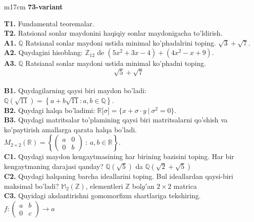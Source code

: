 \documentclass{article}
\begin{document}
\begin{tabular}{m{17cm}}
\textbf{73-variant}
\newline

\textbf{T1.} Fundamental teoremalar. \\
\textbf{T2.} Ratsional sonlar maydonini haqiqiy sonlar maydonigacha to'ldirish. \\
\textbf{A1.} \(\mathbb{Q}\) Ratsianal sonlar maydoni ustida minimal ko'phadalrini toping.
\(\sqrt{3} + \sqrt{7}\). \\
\textbf{A2.} Quydagini hisoblang:
\(\mathbb{Z}_{12}\) de \(\left( 5x^{2} + 3x - 4 \right) + \left( 4x^{2} - x + 9 \right)\). \\
\textbf{A3.} \(\mathbb{Q}\) Ratsianal sonlar maydoni ustida minimal ko'phadni toping.
\[\sqrt{5} + \sqrt{7}\] \\
\textbf{B1.} Quydagilarning qaysi biri maydon bo'ladi:
\(\mathbb{Q}\left( \sqrt{11} \right) = \left\{ a + b\sqrt{11}:a,b \in \mathbb{Q} \right\}\). \\
\textbf{B2.} Quydagi halqa bo'ladimi:
\(\mathbb{R\lbrack}\sigma\rbrack = \{ x + \sigma \cdot y\ |\ \sigma^{2} = 0\}\). \\
\textbf{B3.} Quydagi matritsalar to'plamining qaysi biri matritsalarni qo'shish va ko'paytirish amallarga qarata halqa bo'ladi.
\(M_{2 \times 2}\mathbb{(R) =}\left\{ \begin{pmatrix}
a & 0 \\
0 & b
\end{pmatrix}\ :\ a,b \in \mathbb{R} \right\}\). \\
\textbf{C1.} Quydagi maydon kengaytmasining har birining bazisini toping. Har bir kengaytmaning darajasi qanday?
\(\mathbb{Q}\left( \sqrt{5} \right)\) da \(\mathbb{Q}\left( \sqrt{2} + \sqrt{5} \right)\) \\
\textbf{C2.} Quydagi halqaning barcha ideallarini toping. Bul ideallardan qaysi-biri maksimal bo'ladi?
\(\mathbb{M}_{2}\left( \mathbb{Z} \right)\), elementleri \(\mathbb{Z}\) bol\(g'\)an \(2 \times 2\) matrica \\
\textbf{C3.} Quyidagi akslantirishni gomomorfizm shartlariga tekshiring. \(f:\begin{pmatrix}
a & b \\
0 & c
\end{pmatrix} \rightarrow a\) \\

\end{tabular}
\vspace{1cm}
\end{document}
